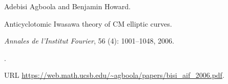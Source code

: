 Adebisi Agboola and Benjamin Howard.

\newblock Anticyclotomic {Iwasawa} theory of {CM} elliptic curves.

\newblock \emph{Annales de l'Institut Fourier}, 56 (4):
  1001--1048, 2006.

\newblock {}.

\newblock URL
  \url{https://web.math.ucsb.edu/~agboola/papers/bisi_aif_2006.pdf}.
